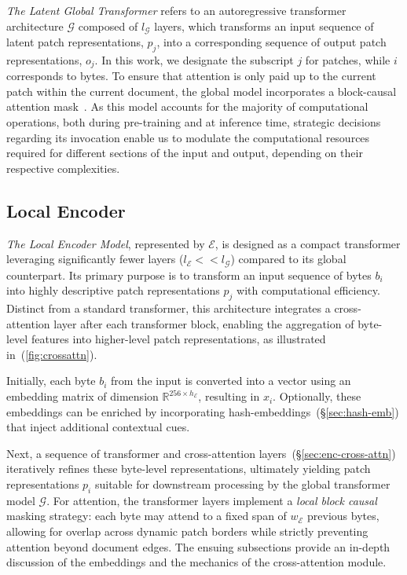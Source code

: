 \textit{The Latent Global Transformer} refers to an autoregressive transformer architecture $\mathcal{G}$ composed of $l_{\mathcal{G}}$ layers, which transforms an input sequence of latent patch representations, $p_j$, into a corresponding sequence of output patch representations, $o_j$. In this work, we designate the subscript $j$ for patches, while $i$ corresponds to bytes. To ensure that attention is only paid up to the current patch within the current document, the global model incorporates a block-causal attention mask~\citep{dubey2024llama}. As this model accounts for the majority of computational operations, both during pre-training and at inference time, strategic decisions regarding its invocation enable us to modulate the computational resources required for different sections of the input and output, depending on their respective complexities.

\subsection{Local Encoder}
\label{section:local}

\textit{The Local Encoder Model}, represented by $\mathcal{E}$, is designed as a compact transformer leveraging significantly fewer layers ($l_{\mathcal{E}} << l_{\mathcal{G}}$) compared to its global counterpart. Its primary purpose is to transform an input sequence of bytes $b_i$ into highly descriptive patch representations $p_j$ with computational efficiency. Distinct from a standard transformer, this architecture integrates a cross-attention layer after each transformer block, enabling the aggregation of byte-level features into higher-level patch representations, as illustrated in~(\autoref{fig:crossattn}). 

Initially, each byte $b_i$ from the input is converted into a vector using an embedding matrix of dimension $\mathbb{R}^{256 \times h_{\mathcal{E}}}$, resulting in $x_i$. Optionally, these embeddings can be enriched by incorporating hash-embeddings~(\S\ref{sec:hash-emb}) that inject additional contextual cues. 

Next, a sequence of transformer and cross-attention layers~(\S\ref{sec:enc-cross-attn}) iteratively refines these byte-level representations, ultimately yielding patch representations $p_i$ suitable for downstream processing by the global transformer model $\mathcal{G}$. For attention, the transformer layers implement a \textit{local block causal} masking strategy: each byte may attend to a fixed span of $w_{\mathcal{E}}$ previous bytes, allowing for overlap across dynamic patch borders while strictly preventing attention beyond document edges. The ensuing subsections provide an in-depth discussion of the embeddings and the mechanics of the cross-attention module.

